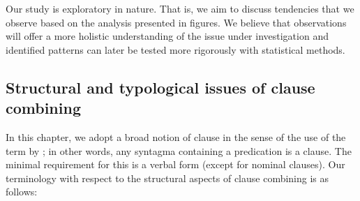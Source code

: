 \documentclass[output=paper,colorlinks,citecolor=brown]{langscibook}
\begin{document}
Our study is exploratory in nature. That is, we aim to discuss tendencies that we observe based on the analysis presented in figures. We believe that observations will offer a more holistic understanding of the issue under investigation and identified patterns can later be tested more rigorously with statistical methods.

\subsection{Structural and typological issues of clause combining} \label{sec:schroederetal:1.1}

In this chapter, we adopt a broad notion of clause in the sense of the use of the term by \textcite[182]{lehmann1988towards}; in other words, any syntagma containing a predication is a clause. The minimal requirement for this is a verbal form (except for nominal clauses).
Our terminology with respect to the structural aspects of clause combining is as follows: 
\end{document}
